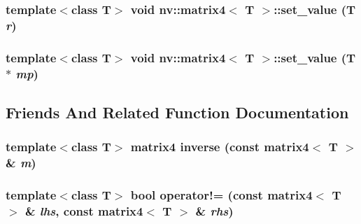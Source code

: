 \hypertarget{classnv_1_1matrix4_36a90d798d71bdd3106ba5cdbbc40869}{
\subsubsection[{set\_\-value}]{\setlength{\rightskip}{0pt plus 5cm}template$<$class T$>$ void {\bf nv::matrix4}$<$ T $>$::set\_\-value (T {\em r})}}
\label{classnv_1_1matrix4_36a90d798d71bdd3106ba5cdbbc40869}


\hypertarget{classnv_1_1matrix4_d19b1f9ae21c90f8a96ef158d8ff62ed}{
\subsubsection[{set\_\-value}]{\setlength{\rightskip}{0pt plus 5cm}template$<$class T$>$ void {\bf nv::matrix4}$<$ T $>$::set\_\-value (T $\ast$ {\em mp})}}
\label{classnv_1_1matrix4_d19b1f9ae21c90f8a96ef158d8ff62ed}




\subsection{Friends And Related Function Documentation}
\hypertarget{classnv_1_1matrix4_1e4721509d63057ed4e2169224806d03}{
\subsubsection[{inverse}]{\setlength{\rightskip}{0pt plus 5cm}template$<$class T$>$ {\bf matrix4} inverse (const {\bf matrix4}$<$ T $>$ \& {\em m})}}
\label{classnv_1_1matrix4_1e4721509d63057ed4e2169224806d03}


\hypertarget{classnv_1_1matrix4_6944f94e4a6431fcaa921dc7422395a0}{
\subsubsection[{operator!=}]{\setlength{\rightskip}{0pt plus 5cm}template$<$class T$>$ bool operator!= (const {\bf matrix4}$<$ T $>$ \& {\em lhs}, \/  const {\bf matrix4}$<$ T $>$ \& {\em rhs})}}
\label{classnv_1_1matrix4_6944f94e4a6431fcaa921dc7422395a0}


